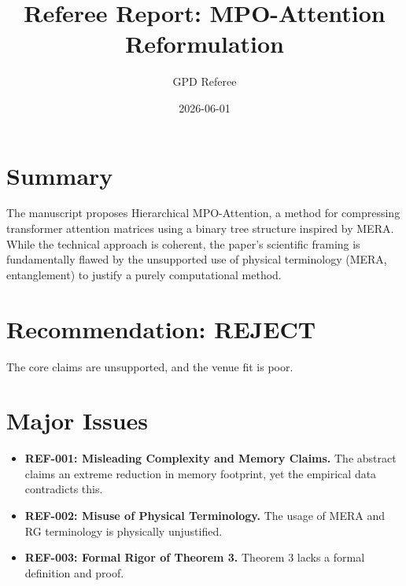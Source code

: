 \documentclass{article}
\title{Referee Report: MPO-Attention Reformulation}
\author{GPD Referee}
\date{2026-06-01}
\begin{document}
\maketitle

\section*{Summary}
The manuscript proposes Hierarchical MPO-Attention, a method for compressing transformer attention matrices using a binary tree structure inspired by MERA. While the technical approach is coherent, the paper's scientific framing is fundamentally flawed by the unsupported use of physical terminology (MERA, entanglement) to justify a purely computational method.

\section*{Recommendation: REJECT}
The core claims are unsupported, and the venue fit is poor.

\section*{Major Issues}
\begin{itemize}
    \item \textbf{REF-001: Misleading Complexity and Memory Claims.} The abstract claims an extreme reduction in memory footprint, yet the empirical data contradicts this.
    \item \textbf{REF-002: Misuse of Physical Terminology.} The usage of MERA and RG terminology is physically unjustified.
    \item \textbf{REF-003: Formal Rigor of Theorem 3.} Theorem 3 lacks a formal definition and proof.
\end{itemize}
\end{document}
